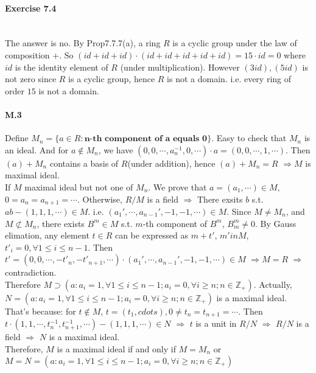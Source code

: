 \documentclass{article}
\begin{document}
\paragraph{Exercise 7.4}\,\\
The answer is no. By Prop7.7.7(a), a ring  $ R  $ is a cyclic group under the law of composition  $ + $. So  $ (id+id+id)\cdot(id+id+id+id+id)=15\cdot id=0 $ where  $ id $ is the identity element of  $ R  $ (under multiplication). However  $ (3id),(5id) $ is not zero since  $ R  $ is a cyclic group, hence  $ R  $ is not a domain. i.e. every ring of order  $ 15  $ is not a domain.
\paragraph{M.3}
Define  $ M_n=\{a\in R:\textbf{n-th component of a equals 0}\} $. Easy to check that  $ M_n  $ is an ideal. And for  $ a\not\in M_n  $, we have  $ (0,0,\cdots,a_n^{-1},0,\cdots) \cdot a=(0,0,\cdots,1,\cdots) $. Then  $ (a)+M_n $ contains a basis of  $ R  $(under addition), hence  $ (a)+M_n=R $  $ \Rightarrow M  $  is maximal ideal.\\
If  $ M  $ maximal ideal but not one of  $ M_n $. We prove that  $ a=(a_1,\cdots)\in M $,  $ 0=a_n=a_{n+1}=\cdots $. Otherwise,  $ R/M $ is a field  $ \Rightarrow $  There exsits  $ b $ s.t.  $ ab-(1,1,1,\cdots)\in M $. i.e.  $ (a_1',\cdots,a_{n-1}',-1,-1,\cdots)\in M $. Since  $ M\not =M_n $, and  $ M\not\subset M_n $, there exists  $ B^m\in M $ s.t.  $ m $-th component of  $ B^m $,  $ B^m_m\not=0 $. By Gauss elimation, any element  $ t\in R  $ can be expressed as  $ m+t' $,  $ m'in M $,  $ t'_i=0,\forall 1 \leq i \leq n-1 $. Then  $ t'=(0,0,\cdots,-t'_n,-t'_{n+1},\cdots)\cdot (a_1',\cdots,a_{n-1}',-1,-1,\cdots)\in M $  $ \Rightarrow M=R $  $\Rightarrow  $  contradiction.\\
Therefore  $ M\supset (a:a_i=1,\forall 1 \leq i \leq n-1;a_i=0,\forall i \geq n;n\in \mathbb{Z}_+) $. Actually,  $ N=(a:a_i=1,\forall 1 \leq i \leq n-1;a_i=0,\forall i \geq n;n\in \mathbb{Z}_+)  $ is a maximal ideal. That's because: for  $ t\not\in M $,  $ t=(t_1,cdots),0\not=t_n=t_{n+1}=\cdots $. Then  $ t\cdot (1,1,\cdots,t_n^{-1},t_{n+1}^{-1},\cdots)-(1,1,1,\cdots)\in N $  $ \Rightarrow  $  $ t  $ is a unit in  $ R/N  $  $ \Rightarrow  $  $ R/N  $ is a field  $ \Rightarrow  $  $ N  $ is a maximal ideal.\\
Therefore,  $ M  $ is a maximal ideal if and only if  $ M=M_n  $ or  $ M=N=(a:a_i=1,\forall 1 \leq i \leq n-1;a_i=0,\forall i \geq n;n\in \mathbb{Z}_+) $                    
\end{document}
